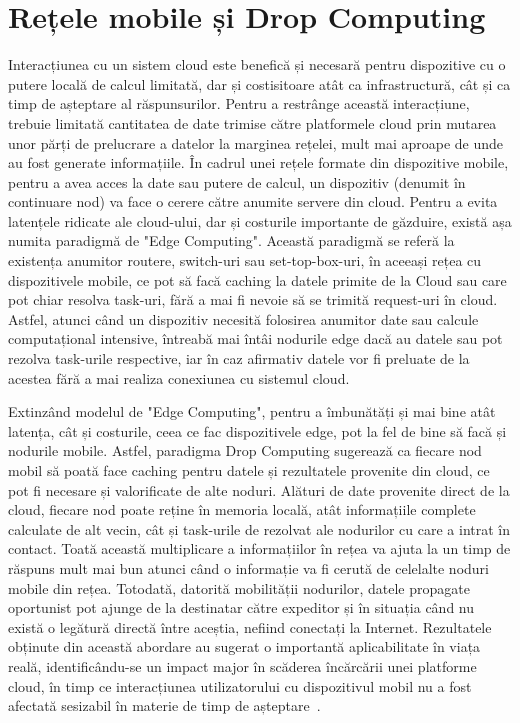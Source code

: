 \documentclass[12pt,a4paper]{report}
\begin{document}
\section{Rețele mobile și Drop Computing}
Interacțiunea cu un sistem cloud este benefică și necesară pentru dispozitive cu o putere locală de calcul limitată, dar și costisitoare atât ca infrastructură, cât și ca timp de așteptare al răspunsurilor. Pentru a restrânge această interacțiune, trebuie limitată cantitatea de date trimise către platformele cloud prin mutarea unor părți de prelucrare a datelor la marginea rețelei, mult mai aproape de unde au fost generate informațiile. În cadrul unei rețele formate din dispozitive mobile, pentru a avea acces la date sau putere de calcul, un dispozitiv (denumit în continuare nod) va face o cerere către anumite servere din cloud. Pentru a evita latențele ridicate ale cloud-ului, dar și costurile importante de găzduire, există așa numita paradigmă de "Edge Computing". Această paradigmă se referă la existența anumitor routere, switch-uri sau set-top-box-uri, în aceeași rețea cu dispozitivele mobile, ce pot să facă caching la datele primite de la Cloud sau care pot chiar resolva task-uri, fără a mai fi nevoie să se trimită request-uri în cloud. Astfel, atunci când un dispozitiv necesită folosirea anumitor date sau calcule computațional intensive, întreabă mai întâi nodurile edge dacă au datele sau pot rezolva task-urile respective, iar în caz afirmativ datele vor fi preluate de la acestea fără a mai realiza conexiunea cu sistemul cloud.

Extinzând modelul de "Edge Computing", pentru a îmbunătăți și mai bine atât latența, cât și costurile, ceea ce fac dispozitivele edge, pot la fel de bine să facă și nodurile mobile. Astfel, paradigma Drop Computing sugerează ca fiecare nod mobil să poată face caching pentru datele și rezultatele provenite din cloud, ce pot fi necesare și valorificate de alte noduri. Alături de date provenite direct de la cloud, fiecare nod poate reține în memoria locală, atât informațiile complete calculate de alt vecin, cât și task-urile de rezolvat ale nodurilor cu care a intrat în contact. Toată această multiplicare a informațiilor în rețea va ajuta la un timp de răspuns mult mai bun atunci când o informație va fi cerută de celelalte noduri mobile din rețea. Totodată, datorită mobilității nodurilor, datele propagate oportunist pot ajunge de la destinatar către expeditor și în situația când nu există o legătură directă între aceștia, nefiind conectați la Internet. Rezultatele obținute din această abordare au sugerat o importantă aplicabilitate în viața reală, identificându-se un impact major în scăderea încărcării unei platforme cloud, în timp ce interacțiunea utilizatorului cu dispozitivul mobil nu a fost afectată sesizabil în materie de timp de așteptare~\cite{DC}.
\end{document}
